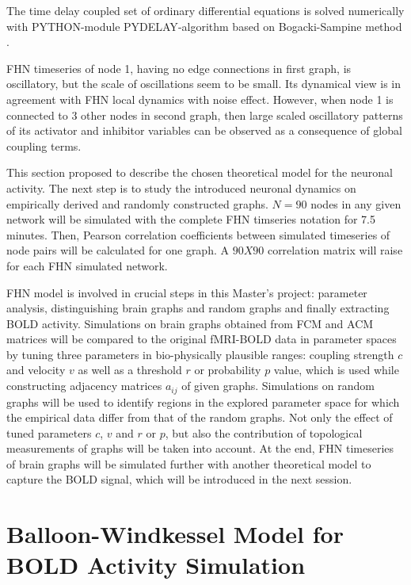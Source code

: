 The time delay coupled set of ordinary differential equations is solved numerically with \textsc{PYTHON}-module \textsc{PYDELAY}-algorithm based on Bogacki-Sampine method \citep{FLU09a, BOG89}. 


FHN timeseries of node 1, having no edge connections in first graph, is oscillatory, but the scale of oscillations seem to be small. Its dynamical view is in agreement with FHN local dynamics with noise effect. However, when node 1 is connected to 3 other nodes in second graph, then large scaled oscillatory patterns of its activator and inhibitor variables can be observed as a consequence of global coupling terms. 

This section proposed to describe the chosen theoretical model for the neuronal activity. The next step is to study the introduced neuronal dynamics on empirically derived and randomly constructed graphs. $N=90$ nodes  in any given network will be simulated with the complete FHN timseries notation for 7.5 minutes. Then, Pearson correlation coefficients between simulated timeseries of node pairs will be calculated for one graph. A $90X90$ correlation matrix will raise for each FHN simulated network.

FHN model is involved in crucial steps in this Master's project: parameter analysis, distinguishing brain graphs and random graphs and finally extracting BOLD activity. Simulations on brain graphs obtained from FCM and ACM matrices will be compared to the original fMRI-BOLD data in parameter spaces by tuning three parameters in bio-physically plausible ranges: coupling strength $c$ and velocity $v$ as well as a threshold $r$ or probability $p$ value, which is used while constructing adjacency matrices $a_{ij}$ of given graphs. Simulations on random graphs will be used to identify regions in the explored parameter space for which the empirical data differ from that of the random graphs. Not only the effect of tuned parameters $c$, $v$ and $r$ or $p$, but also the contribution of topological measurements of graphs will be taken into account. At the end, FHN timeseries of brain graphs will be simulated further with another theoretical model to capture the BOLD signal, which will be introduced in the next session.   



\section{Balloon-Windkessel Model for BOLD Activity Simulation} 






























 
